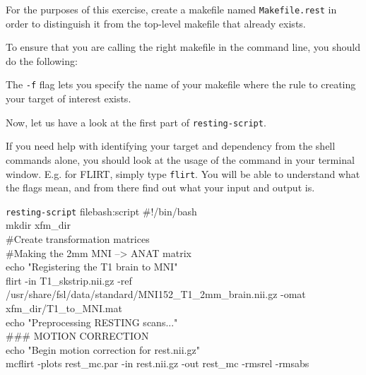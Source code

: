 For the purposes of this exercise, create a makefile named \texttt{Makefile.rest} in order to distinguish it from the top-level makefile that already exists.

To ensure that you are calling the right makefile in the command line, you should do the following: 

The \texttt{-f} flag lets you specify the name of your makefile where the rule to creating your target of interest exists.

Now, let us have a look at the first part of \texttt{resting-script}.

If you need help with identifying your target and dependency from the shell commands alone, you should look at the usage of the command in your terminal window. E.g. for FLIRT, simply type \texttt{flirt}. You will be able to understand what the flags mean, and from there find out what your input and output is.

\begin{bash}{\texttt{resting-script} file}{bash:script}
\#!/bin/bash \\

mkdir xfm_dir \\

\#Create transformation matrices \\

\#Making the 2mm MNI --> ANAT matrix \\
echo "Registering the T1 brain to MNI" \\
flirt -in T1_skstrip.nii.gz -ref /usr/share/fsl/data/standard/MNI152_T1_2mm_brain.nii.gz -omat xfm_dir/T1_to_MNI.mat \\
echo "Preprocessing RESTING scans..." \\

\#\#\# MOTION CORRECTION \\
echo "Begin motion correction for rest.nii.gz" \\
mcflirt -plots rest_mc.par -in rest.nii.gz -out rest_mc -rmsrel -rmsabs 
\end{bash}

